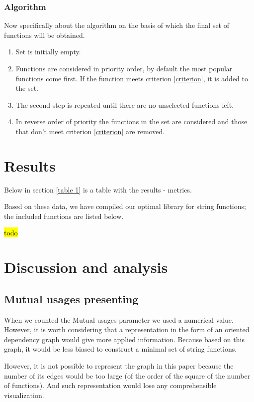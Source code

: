 \documentclass[anonymous,sigplan,review,11pt,nonacm,natbib=false]{acmart}
\begin{document}
    \subsubsection{Algorithm}

    Now specifically about the algorithm on the basis of which the final set of functions will be obtained.

    \begin{enumerate}
        \item Set is initially empty.
        \item Functions are considered in priority order, by default the most popular functions come first. If the function meets criterion \ref{criterion}, it is added to the set.
        \item The second step is repeated until there are no unselected functions left.
        \item In reverse order of priority the functions in the set are considered and those that don't meet criterion \ref{criterion} are removed.
    \end{enumerate}

    \section{Results}

    Below in section \ref{table 1} is a table with the results - metrics.

    Based on these data, we have compiled our optimal library for string functions; the included functions are listed below.

    \hl{todo}

    \section{Discussion and analysis}

    \subsection{Mutual usages presenting}

    When we counted the Mutual usages parameter we used a numerical value. However, it is worth considering that a representation in the form of an oriented dependency graph would give more applied information. Because based on this graph, it would be less biased to construct a minimal set of string functions.

    However, it is not possible to represent the graph in this paper because the number of its edges would be too large (of the order of the square of the number of functions). And such representation would lose any comprehensible visualization.
\end{document}
